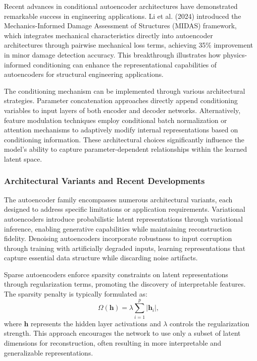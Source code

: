 \documentclass[12pt,a4paper]{report}
\begin{document}
Recent advances in conditional autoencoder architectures have demonstrated remarkable success in engineering applications. Li et al. (2024) introduced the Mechanics-Informed Damage Assessment of Structures (MIDAS) framework, which integrates mechanical characteristics directly into autoencoder architectures through pairwise mechanical loss terms, achieving 35\% improvement in minor damage detection accuracy. This breakthrough illustrates how physics-informed conditioning can enhance the representational capabilities of autoencoders for structural engineering applications.

The conditioning mechanism can be implemented through various architectural strategies. Parameter concatenation approaches directly append conditioning variables to input layers of both encoder and decoder networks. Alternatively, feature modulation techniques employ conditional batch normalization or attention mechanisms to adaptively modify internal representations based on conditioning information. These architectural choices significantly influence the model's ability to capture parameter-dependent relationships within the learned latent space.

\subsubsection*{Architectural Variants and Recent Developments}

The autoencoder family encompasses numerous architectural variants, each designed to address specific limitations or application requirements. Variational autoencoders introduce probabilistic latent representations through variational inference, enabling generative capabilities while maintaining reconstruction fidelity. Denoising autoencoders incorporate robustness to input corruption through training with artificially degraded inputs, learning representations that capture essential data structure while discarding noise artifacts.

Sparse autoencoders enforce sparsity constraints on latent representations through regularization terms, promoting the discovery of interpretable features. The sparsity penalty is typically formulated as:
\[
\Omega(\mathbf{h}) = \lambda \sum_{i=1}^{p} |\mathbf{h}_i|,
\]
where $\mathbf{h}$ represents the hidden layer activations and $\lambda$ controls the regularization strength. This approach encourages the network to use only a subset of latent dimensions for reconstruction, often resulting in more interpretable and generalizable representations.
\end{document}
